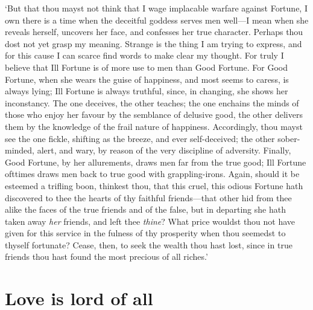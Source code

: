 \documentclass[12pt]{book}
\begin{document}
`But that thou mayst not think that I wage implacable warfare against
Fortune, I own there is a time when the deceitful goddess serves men
well---I mean when she reveals herself, uncovers her face, and confesses
her true character. Perhaps thou dost not yet grasp my meaning. Strange
is the thing I am trying to express, and for this cause I can scarce
find words to make clear my thought. For truly I believe that Ill
Fortune is of more use to men than Good Fortune. For Good Fortune, when
she wears the guise of happiness, and most seems to caress, is always
lying; Ill Fortune is always truthful, since, in changing, she shows her
inconstancy. The one deceives, the other teaches; the one enchains the
minds of those who enjoy her favour by the semblance of delusive good,
the other delivers them by the knowledge of the frail nature of
happiness. Accordingly, thou mayst see the one fickle, shifting as the
breeze, and ever self-deceived; the other sober-minded, alert, and wary,
by reason of the very discipline of adversity. Finally, Good Fortune, by
her allurements, draws men far from the true good; Ill Fortune ofttimes
draws men back to true good with grappling-irons. Again, should it be
esteemed a trifling boon, thinkest thou, that this cruel, this odious
Fortune hath discovered to thee the hearts of thy faithful friends---that
other hid from thee alike the faces of the true friends and of the
false, but in departing she hath taken away \emph{her} friends, and left thee
\emph{thine}? What price wouldst thou not have given for this service in the
fulness of thy prosperity when thou seemedst to thyself fortunate?
Cease, then, to seek the wealth thou hast lost, since in true friends
thou hast found the most precious of all riches.'




\section{Love is lord of all}
\end{document}
